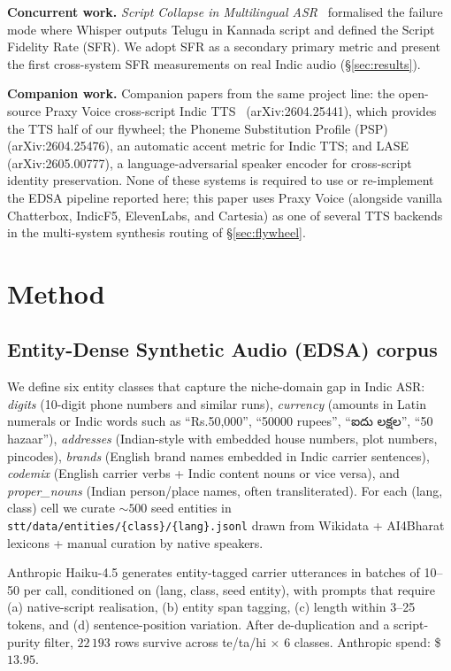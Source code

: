 \documentclass[conference,a4paper]{IEEEtran}
\newcommand{\rupee}{Rs.}
\newcommand{\rupee}{{\indicfont ₹}}
\begin{document}
\textbf{Concurrent work.}
\emph{Script Collapse in Multilingual ASR}~\cite{script_collapse_2026} formalised the failure mode where Whisper outputs Telugu in Kannada script and defined the Script Fidelity Rate (SFR). We adopt SFR as a secondary primary metric and present the first cross-system SFR measurements on real Indic audio (\S\ref{sec:results}).

\textbf{Companion work.}
Companion papers from the same project line: the open-source Praxy Voice cross-script Indic TTS~\cite{praxy_voice_2026} (arXiv:2604.25441), which provides the TTS half of our flywheel; the Phoneme Substitution Profile (PSP)~\cite{psp_2026} (arXiv:2604.25476), an automatic accent metric for Indic TTS; and LASE~\cite{lase_2026} (arXiv:2605.00777), a language-adversarial speaker encoder for cross-script identity preservation. None of these systems is required to use or re-implement the EDSA pipeline reported here; this paper uses Praxy Voice (alongside vanilla Chatterbox, IndicF5, ElevenLabs, and Cartesia) as one of several TTS backends in the multi-system synthesis routing of \S\ref{sec:flywheel}.

\section{Method}\label{sec:method}

\subsection{Entity-Dense Synthetic Audio (EDSA) corpus}\label{sec:edsa}

We define six entity classes that capture the niche-domain gap in Indic ASR: \emph{digits} (10-digit phone numbers and similar runs), \emph{currency} (amounts in Latin numerals or Indic words such as ``\rupee{}50,000'', ``50000 rupees'', ``{\telugufont ఐదు లక్షల}'', ``50 hazaar''), \emph{addresses} (Indian-style with embedded house numbers, plot numbers, pincodes), \emph{brands} (English brand names embedded in Indic carrier sentences), \emph{codemix} (English carrier verbs + Indic content nouns or vice versa), and \emph{proper\_nouns} (Indian person/place names, often transliterated). For each (lang, class) cell we curate $\sim 500$ seed entities in \texttt{stt/data/entities/\{class\}/\{lang\}.jsonl} drawn from Wikidata + AI4Bharat lexicons + manual curation by native speakers.

Anthropic Haiku-4.5 generates entity-tagged carrier utterances in batches of 10--50 per call, conditioned on (lang, class, seed entity), with prompts that require (a) native-script realisation, (b) entity span tagging, (c) length within 3--25 tokens, and (d) sentence-position variation. After de-duplication and a script-purity filter, $22\,193$ rows survive across te/ta/hi $\times$ 6 classes. Anthropic spend: \$$13.95$.
\end{document}
